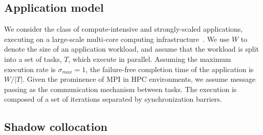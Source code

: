 

\subsection {Application model}
\label{sec:app_model}

We consider the class of compute-intensive and strongly-scaled applications, executing on a large-scale multi-core computing infrastructure~\cite{doe_ascr_exascale_2011}. %
We use $W$ to denote the size of an application workload, and assume that the workload is split into a set of tasks, $T$, which execute in parallel. %
Assuming the maximum execution rate is $\sigma_{max}=1$, the failure-free completion time of the application is $W/|T|$. 
Given the prominence of MPI in HPC environments, we assume message passing as the communication mechanism between tasks. %
The execution is composed of a set of iterations separated by synchronization barriers. 




\subsection{Shadow collocation}

